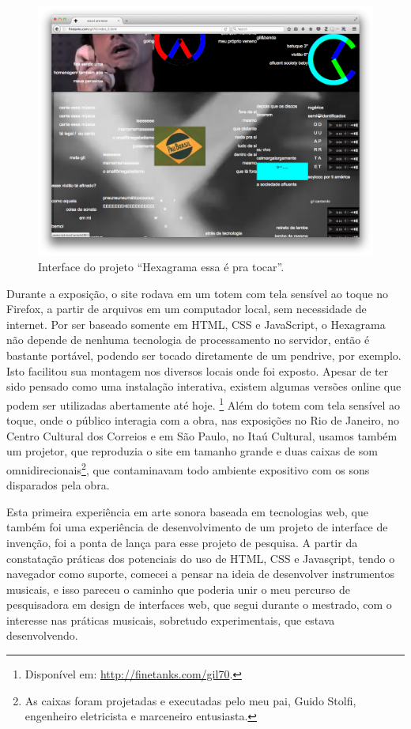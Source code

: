 \begin{figure}

\includegraphics[width=1\textwidth]{pictures/cap1/gil702}
\caption{Interface do projeto ``Hexagrama essa é pra tocar''.}
\label{fig:gil702}
\end{figure}

Durante a exposição, o site rodava em um totem com tela sensível ao toque no Firefox, a partir de arquivos em um computador local, sem necessidade de internet. Por ser baseado somente em HTML, CSS e JavaScript, o Hexagrama não depende de nenhuma tecnologia de processamento no servidor, então é bastante portável, podendo ser tocado diretamente de um pendrive, por exemplo. Isto facilitou sua montagem nos diversos locais onde foi exposto. Apesar de ter sido pensado como uma instalação interativa, existem algumas versões online que podem ser utilizadas abertamente até hoje. \footnote{Disponível em: \url{http://finetanks.com/gil70}.}
Além do totem com tela sensível ao toque, onde o público interagia com a obra, nas exposições no Rio de Janeiro, no Centro Cultural dos Correios e em São Paulo, no Itaú Cultural, usamos também um projetor, que reproduzia o site em tamanho grande e duas caixas de som omnidirecionais\footnote{As caixas foram projetadas e executadas pelo meu pai, Guido Stolfi, engenheiro eletricista e marceneiro entusiasta.}, que contaminavam todo ambiente expositivo com os sons disparados pela obra.

Esta primeira experiência em arte sonora baseada em tecnologias web, que também foi uma experiência de desenvolvimento de um projeto de interface de invenção, foi a ponta de lança para esse projeto de pesquisa. A partir da constatação práticas dos potenciais do uso de HTML, CSS e Javasçript, tendo o navegador como suporte, comecei a pensar na ideia de desenvolver instrumentos musicais, e isso pareceu o caminho que poderia unir o meu percurso de pesquisadora em design de interfaces web, que segui durante o mestrado, com o interesse nas práticas musicais, sobretudo experimentais, que estava desenvolvendo.


\newpage